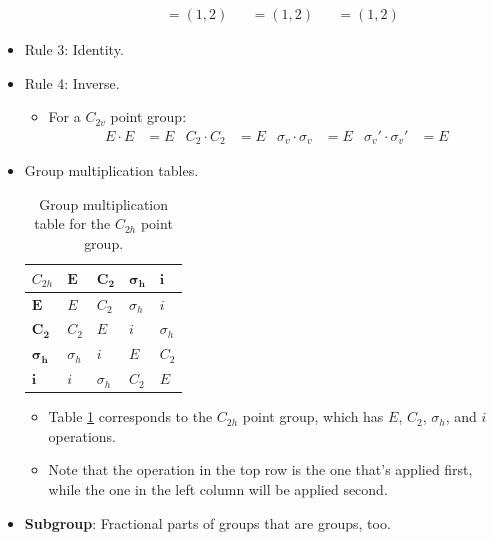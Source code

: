 \documentclass[../main.tex]{subfiles}
\begin{document}
\begin{itemize}
\begin{itemize}
\begin{align*}
            &= (1,2)&
                &= (1,2)&
                    &= (1,2)
        \end{align*}
    \end{itemize}
    \item Rule 3: Identity.
    \item Rule 4: Inverse.
    \begin{itemize}
        \item For a $C_{2v}$ point group:
        \begin{align*}
            E\cdot E &= E&
            C_2\cdot C_2 &= E&
            \sigma_v\cdot\sigma_v &= E&
            \sigma_v'\cdot\sigma_v' &= E
        \end{align*}
    \end{itemize}
    \item Group multiplication tables.
    \begin{table}[H]
        \centering
        \renewcommand{\arraystretch}{1.4}
        \footnotesize
        \begin{tabular}{l|llll}
            \normalsize$C_{2h}$ & $\bm{E}$   & $\bm{C_2}$ & $\bm{\sigma_h}$ & $\bm{i}$\\
            \hline
            $\bm{E}$            & $E$        & $C_2$      & $\sigma_h$      & $i$\\
            $\bm{C_2}$          & $C_2$      & $E$        & $i$             & $\sigma_h$\\
            $\bm{\sigma_h}$     & $\sigma_h$ & $i$        & $E$             & $C_2$\\
            $\bm{i}$            & $i$        & $\sigma_h$ & $C_2$           & $E$\\
        \end{tabular}
        \caption{Group multiplication table for the $C_{2h}$ point group.}
        \label{tab:groupMultiplication-C2h}
    \end{table}
    \begin{itemize}
        \item Table \ref{tab:groupMultiplication-C2h} corresponds to the $C_{2h}$ point group, which has $E$, $C_2$, $\sigma_h$, and $i$ operations.
        \item Note that the operation in the top row is the one that's applied first, while the one in the left column will be applied second.
    \end{itemize}
    \item \textbf{Subgroup}: Fractional parts of groups that are groups, too.
    \begin{table}[h!]

\end{table}
\end{itemize}
\end{document}
